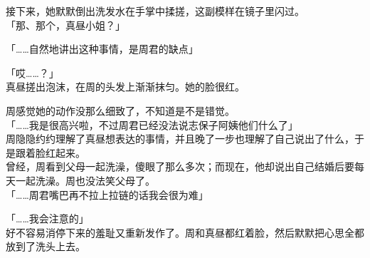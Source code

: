 接下来，她默默倒出洗发水在手掌中揉搓，这副模样在镜子里闪过。\\

「那、那个，真昼小姐？」

「……自然地讲出这种事情，是周君的缺点」

「哎……？」\\

真昼搓出泡沫，在周的头发上渐渐抹匀。她的脸很红。

周感觉她的动作没那么细致了，不知道是不是错觉。\\

「……我是很高兴啦，不过周君已经没法说志保子阿姨他们什么了」\\

周隐隐约约理解了真昼想表达的事情，并且晚了一步也理解了自己说出了什么，于是跟着脸红起来。\\

曾经，周看到父母一起洗澡，傻眼了那么多次；而现在，他却说出自己结婚后要每天一起洗澡。周也没法笑父母了。\\

「……周君嘴巴再不拉上拉链的话我会很为难」

「……我会注意的」\\

好不容易消停下来的羞耻又重新发作了。周和真昼都红着脸，然后默默把心思全都放到了洗头上去。
